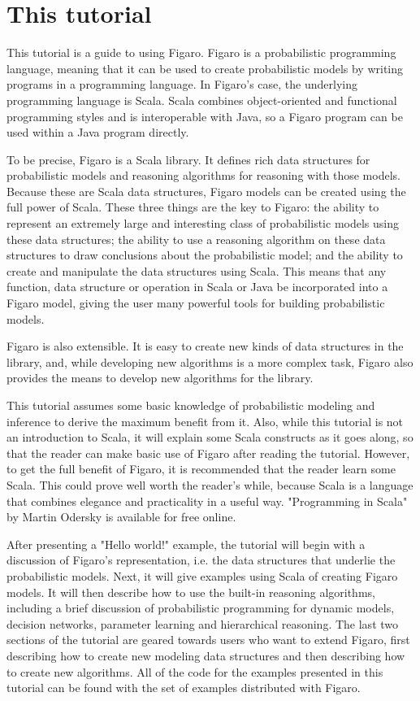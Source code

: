 
\section{This tutorial}

This tutorial is a guide to using Figaro. Figaro is a probabilistic programming language, meaning that it can be used to create probabilistic models by writing programs in a programming language. In Figaro's case, the underlying programming language is Scala. Scala combines object-oriented and functional programming styles and is interoperable with Java, so a Figaro program can be used within a Java program directly.

To be precise, Figaro is a Scala library. It defines rich data structures for probabilistic models and reasoning algorithms for reasoning with those models. Because these are Scala data structures, Figaro
models can be created using the full power of Scala. These three things are the key to Figaro: the ability to represent an extremely large and interesting class of probabilistic models using these data structures;
the ability to use a reasoning algorithm on these data structures to draw conclusions about the probabilistic model; and the ability to create and manipulate the data structures using Scala. This means that any function, data structure or operation in Scala or Java be incorporated into a Figaro model, giving
the user many powerful tools for building probabilistic models.

Figaro is also extensible. It is easy to create new kinds of data structures in the library, and, while developing new algorithms is a more complex task, Figaro also provides the means to develop new
algorithms for the library.

This tutorial assumes some basic knowledge of probabilistic modeling and inference to derive the maximum benefit from it. Also, while this tutorial is not an introduction to Scala, it will explain some Scala constructs as it goes along, so that the reader can make basic use of Figaro after reading the tutorial. However, to get the full benefit of Figaro, it is recommended that the reader learn some Scala. This could prove well worth the reader's while, because Scala is a language that combines elegance and practicality in a useful way. "Programming in Scala" by Martin Odersky is available for free online.

After presenting a "Hello world!" example, the tutorial will begin with a discussion of Figaro's representation, i.e. the data structures that underlie the probabilistic models. Next, it will give examples
using Scala of creating Figaro models. It will then describe how to use the built-in reasoning algorithms, including a brief discussion of probabilistic programming for dynamic models, decision networks,
parameter learning and hierarchical reasoning. The last two sections of the tutorial are geared towards users who want to extend Figaro, first describing how to create new modeling data structures and then describing how to create new algorithms. All of the code for the examples presented in this tutorial can be
found with the set of examples distributed with Figaro.

